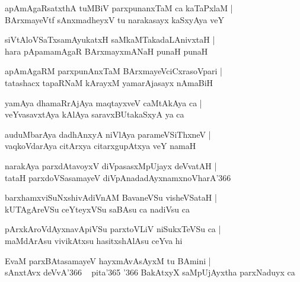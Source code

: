 \documentclass[twoside,12pt,openright]{book}
\newcounter{shloka}[chapter]
\begin{document}
\begin{shloka}%
apAmAgaRsatxthA tuMBiV parxpunanxTaM ca kaTaPxlaM |\\
BArxmayeVtf sAnxmadheyxV tu narakasayx kaSxyAya veY
\end{shloka}

\begin{shloka}%
siVtAloVSaTxsamAyukatxH saMkaMTakadaLAnivxtaH |\\
hara pApamamAgaR BArxmayxmANaH punaH punaH 
\end{shloka}

\begin{shloka}%
apAmAgaRM parxpunAnxTaM BArxmayeVciCxrasoVpari |\\
tatashacx tapaRNaM kArayxM yamarAjasayx nAmaBiH 
\end{shloka}

\begin{shloka}%
yamAya dhamaRrAjAya maqtayxveV caMtAkAya ca |\\
veYvasavxtAya kAlAya saravxBUtakaSxyA ya ca 
\end{shloka}

\begin{shloka}%
auduMbarAya dadhAnxyA niVlAya parameVSiThxneV |\\
vaqkoVdarAya citArxya citarxgupAtxya veY namaH 
\end{shloka}

\begin{shloka}%
narakAya parxdAtavoyxV diVpasasxMpUjayx deVvatAH |\\
tataH parxdoVSasamayeV diVpAnadadAyxnamxnoVharA\char'366
\end{shloka}

\begin{shloka}%
barxhamxviSuNxshivAdiVnAM BavaneVSu visheVSataH |\\
kUTAgAreVSu ceYteyxVSu saBAsu ca nadiVsu ca 
\end{shloka}

\begin{shloka}%
pArxkAroVdAyxnavApiVSu parxtoVLiV niSukxTeVSu ca |\\
maMdArAsu vivikAtxsu hasitxshAlAsu ceYva hi 
\end{shloka}

\begin{shloka}%
EvaM parxBAtasamayeV hayxmAvAsAyxM tu BAmini |\\
sAnxtAvx deVvA\char'366 ~ pita\char'365 \char'366 BakAtxyX saMpUjAyxtha parxNaduyx ca 
\end{shloka}
\end{document}
